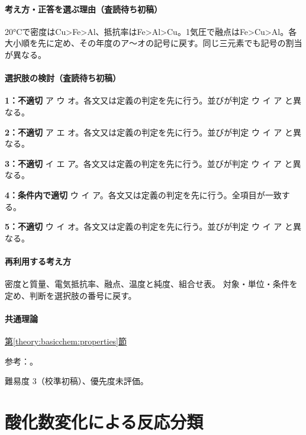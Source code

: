 \paragraph{考え方・正答を選ぶ理由（査読待ち初稿）} 20°Cで密度はCu>Fe>Al、抵抗率はFe>Al>Cu。1気圧で融点はFe>Cu>Al。各大小順を先に定め、その年度のア〜オの記号に戻す。同じ三元素でも記号の割当が異なる。

\paragraph{選択肢の検討（査読待ち初稿）}\mbox{}\par

\noindent\textbf{1：不適切} ア ウ オ。各文又は定義の判定を先に行う。並びが判定 ウ イ ア と異なる。\par

\noindent\textbf{2：不適切} ア エ オ。各文又は定義の判定を先に行う。並びが判定 ウ イ ア と異なる。\par

\noindent\textbf{3：不適切} イ エ ア。各文又は定義の判定を先に行う。並びが判定 ウ イ ア と異なる。\par

\noindent\textbf{4：条件内で適切} ウ イ ア。各文又は定義の判定を先に行う。全項目が一致する。\par

\noindent\textbf{5：不適切} ウ イ オ。各文又は定義の判定を先に行う。並びが判定 ウ イ ア と異なる。\par

\paragraph{再利用する考え方} 密度と質量、電気抵抗率、融点、温度と純度、組合せ表。 対象・単位・条件を定め、判断を選択肢の番号に戻す。

\paragraph{共通理論} \hyperref[theory:basicchem:properties]{第\ref*{theory:basicchem:properties}節}

\par 参考：\cite{openstax_resistivity,chem55_properties,chem55_properties_al,chem55_properties_fe}。

\par 難易度 3（校準初稿）、優先度未評価。

\section{酸化数変化による反応分類}

